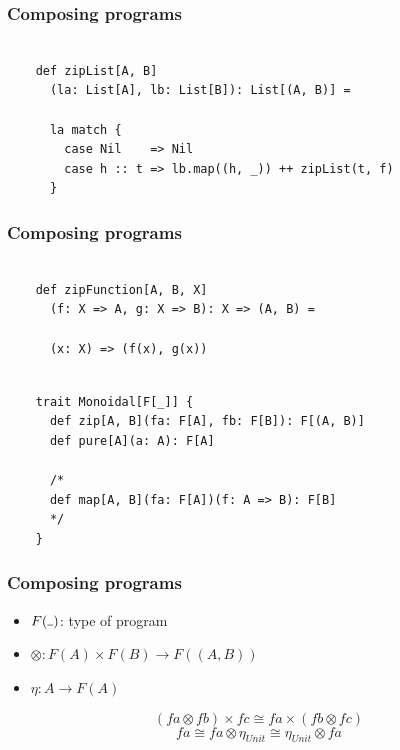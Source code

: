 \documentclass{beamer}
\newcommand{\gpause}{\vspace*{-\baselineskip}\pause}
\begin{document}
\begin{frame}[fragile]

  \frametitle{Composing programs}

  \begin{verbatim}

    def zipList[A, B]
      (la: List[A], lb: List[B]): List[(A, B)] =

      la match {
        case Nil    => Nil
        case h :: t => lb.map((h, _)) ++ zipList(t, f)
      }

  \end{verbatim}

\end{frame}

\begin{frame}[fragile]

  \frametitle{Composing programs}

  \begin{verbatim}

    def zipFunction[A, B, X]
      (f: X => A, g: X => B): X => (A, B) =

      (x: X) => (f(x), g(x))

  \end{verbatim}

\end{frame}

\begin{frame}[fragile]

  \begin{verbatim}

    trait Monoidal[F[_]] {
      def zip[A, B](fa: F[A], fb: F[B]): F[(A, B)]
      def pure[A](a: A): F[A]

      /*
      def map[A, B](fa: F[A])(f: A => B): F[B]
      */
    }

  \end{verbatim}

\end{frame}

\begin{frame}[fragile]

  \frametitle{Composing programs}
  \large

  \begin{itemize}
    \item $F(\rule{1ex}{.4pt})$: type of program \pause
    \item $\otimes: F(A) \times F(B) \rightarrow F((A, B))$ \pause
    \item $\eta: A \rightarrow F(A)$ \pause
  \end{itemize}

  $$(fa \otimes fb) \times fc \cong fa \times (fb \otimes fc)$$ \gpause
  $$fa \cong fa \otimes \eta_{Unit} \cong \eta_{Unit} \otimes fa$$

\end{frame}
\end{document}

